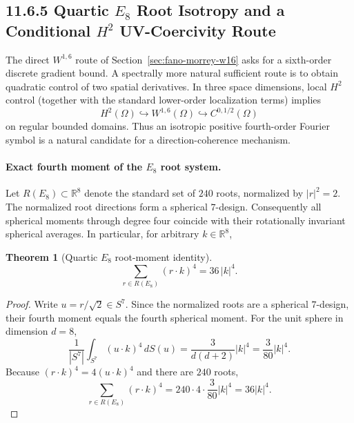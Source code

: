 \documentclass{article}
\newtheorem{theorem}{Theorem}[section]
\begin{document}
\subsection*{11.6.5 Quartic $E_8$ Root Isotropy and a Conditional $H^2$ UV-Coercivity Route}
\label{sec:e8-quartic-uv}

The direct $W^{1,6}$ route of Section~\ref{sec:fano-morrey-w16} asks for a
sixth-order discrete gradient bound.  A spectrally more natural sufficient
route is to obtain quadratic control of two spatial derivatives.  In three
space dimensions, local $H^2$ control (together with the standard lower-order
localization terms) implies
\begin{equation}
H^2(\Omega)\hookrightarrow W^{1,6}(\Omega)
\hookrightarrow C^{0,1/2}(\Omega)
\end{equation}
on regular bounded domains.  Thus an isotropic positive fourth-order Fourier
symbol is a natural candidate for a direction-coherence mechanism.

\paragraph{Exact fourth moment of the $E_8$ root system.}
Let $R(E_8)\subset\mathbb R^8$ denote the standard set of $240$ roots,
normalized by $|r|^2=2$.  The normalized root directions form a spherical
$7$-design.  Consequently all spherical moments through degree four coincide
with their rotationally invariant spherical averages.  In particular, for
arbitrary $k\in\mathbb R^8$,
\begin{theorem}[Quartic $E_8$ root-moment identity]
\begin{equation}
\boxed{
\sum_{r\in R(E_8)}(r\cdot k)^4=36\,|k|^4.
}
\label{eq:e8-fourth-moment}
\end{equation}
\end{theorem}

\begin{proof}
Write $u=r/\sqrt2\in S^7$.  Since the normalized roots are a spherical
$7$-design, their fourth moment equals the fourth spherical moment.  For the
unit sphere in dimension $d=8$,
\begin{equation}
\frac{1}{|S^7|}\int_{S^7}(u\cdot k)^4\,dS(u)
=\frac{3}{d(d+2)}|k|^4
=\frac{3}{80}|k|^4.
\end{equation}
Because $(r\cdot k)^4=4(u\cdot k)^4$ and there are $240$ roots,
\begin{equation}
\sum_{r\in R(E_8)}(r\cdot k)^4
=240\cdot4\cdot\frac{3}{80}|k|^4
=36|k|^4.
\end{equation}
\end{proof}
\end{document}
